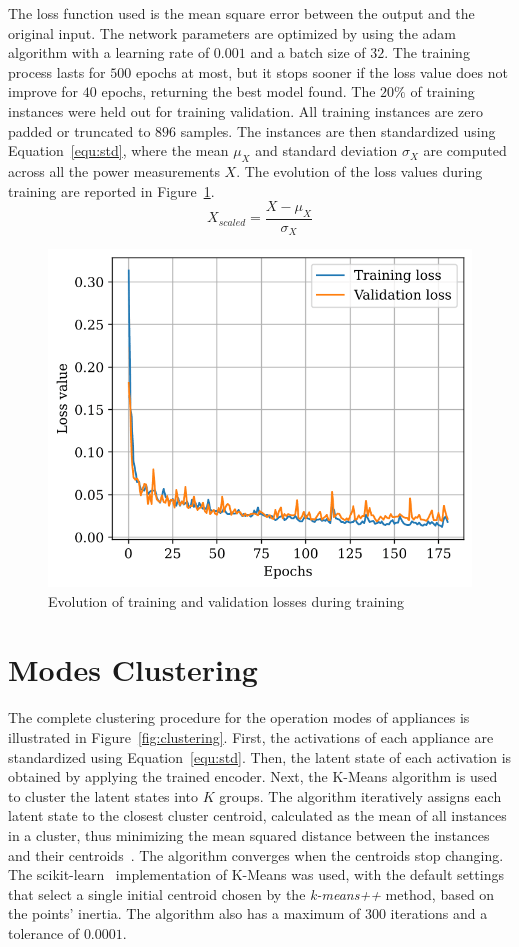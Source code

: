 The loss function used is the mean square error between the output and the original input. The network parameters are optimized by using the \acrfull{adam} algorithm with a learning rate of $0.001$ and a batch size of $32$. The training process lasts for $500$ epochs at most, but it stops sooner if the loss value does not improve for $40$ epochs, returning the best model found. The $20\%$ of training instances were held out for training validation. All training instances are zero padded or truncated to $896$ samples. The instances are then standardized using Equation~\eqref{equ:std}, where the mean $\mu_X$ and standard deviation $\sigma_X$ are computed across all the power measurements $X$. The evolution of the loss values during training are reported in Figure~\ref{fig:autoencoder_losses}.
\begin{equation}\label{equ:std}
    X_{scaled} = \frac{X - \mu_X}{\sigma_X}
\end{equation}

\begin{figure}
    \centering
    \includegraphics[width=.6\linewidth]{images/loss.png}
    \caption{Evolution of training and validation losses during training}
    \label{fig:autoencoder_losses}
\end{figure}

\section{Modes Clustering}

The complete clustering procedure for the operation modes of appliances is illustrated in Figure~\ref{fig:clustering}. First, the activations of each appliance are standardized using Equation~\eqref{equ:std}. Then, the latent state of each activation is obtained by applying the trained encoder. Next, the K-Means algorithm is used to cluster the latent states into $K$ groups. The algorithm iteratively assigns each latent state to the closest cluster centroid, calculated as the mean of all instances in a cluster, thus minimizing the mean squared distance between the instances and their centroids~\parencite{lloyd_least_1982}. The algorithm converges when the centroids stop changing. The scikit-learn~\parencite*{pedregosa_scikit-learn_2011,buitinck_api_2013} implementation of K-Means was used, with the default settings that select a single initial centroid chosen by the \textit{k-means++} method, based on the points’ inertia. The algorithm also has a maximum of $300$ iterations and a tolerance of $0.0001$.

